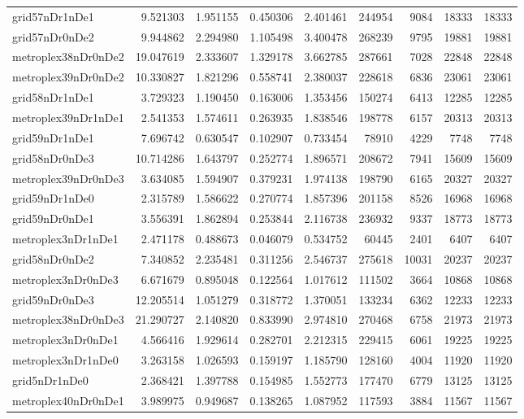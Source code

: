 \begin{longtable}{|l|r|r|r|r|r|r|r|r|}
grid57nDr1nDe1 & 9.521303 & 1.951155 & 0.450306 & 2.401461 & 244954 & 9084 & 18333 & 18333 \\
grid57nDr0nDe2 & 9.944862 & 2.294980 & 1.105498 & 3.400478 & 268239 & 9795 & 19881 & 19881 \\
metroplex38nDr0nDe2 & 19.047619 & 2.333607 & 1.329178 & 3.662785 & 287661 & 7028 & 22848 & 22848 \\
metroplex39nDr0nDe2 & 10.330827 & 1.821296 & 0.558741 & 2.380037 & 228618 & 6836 & 23061 & 23061 \\
grid58nDr1nDe1 & 3.729323 & 1.190450 & 0.163006 & 1.353456 & 150274 & 6413 & 12285 & 12285 \\
metroplex39nDr1nDe1 & 2.541353 & 1.574611 & 0.263935 & 1.838546 & 198778 & 6157 & 20313 & 20313 \\
grid59nDr1nDe1 & 7.696742 & 0.630547 & 0.102907 & 0.733454 & 78910 & 4229 & 7748 & 7748 \\
grid58nDr0nDe3 & 10.714286 & 1.643797 & 0.252774 & 1.896571 & 208672 & 7941 & 15609 & 15609 \\
metroplex39nDr0nDe3 & 3.634085 & 1.594907 & 0.379231 & 1.974138 & 198790 & 6165 & 20327 & 20327 \\
grid59nDr1nDe0 & 2.315789 & 1.586622 & 0.270774 & 1.857396 & 201158 & 8526 & 16968 & 16968 \\
grid59nDr0nDe1 & 3.556391 & 1.862894 & 0.253844 & 2.116738 & 236932 & 9337 & 18773 & 18773 \\
metroplex3nDr1nDe1 & 2.471178 & 0.488673 & 0.046079 & 0.534752 & 60445 & 2401 & 6407 & 6407 \\
grid58nDr0nDe2 & 7.340852 & 2.235481 & 0.311256 & 2.546737 & 275618 & 10031 & 20237 & 20237 \\
metroplex3nDr0nDe3 & 6.671679 & 0.895048 & 0.122564 & 1.017612 & 111502 & 3664 & 10868 & 10868 \\
grid59nDr0nDe3 & 12.205514 & 1.051279 & 0.318772 & 1.370051 & 133234 & 6362 & 12233 & 12233 \\
metroplex38nDr0nDe3 & 21.290727 & 2.140820 & 0.833990 & 2.974810 & 270468 & 6758 & 21973 & 21973 \\
metroplex3nDr0nDe1 & 4.566416 & 1.929614 & 0.282701 & 2.212315 & 229415 & 6061 & 19225 & 19225 \\
metroplex3nDr1nDe0 & 3.263158 & 1.026593 & 0.159197 & 1.185790 & 128160 & 4004 & 11920 & 11920 \\
grid5nDr1nDe0 & 2.368421 & 1.397788 & 0.154985 & 1.552773 & 177470 & 6779 & 13125 & 13125 \\
metroplex40nDr0nDe1 & 3.989975 & 0.949687 & 0.138265 & 1.087952 & 117593 & 3884 & 11567 & 11567 \\

\end{longtable}
